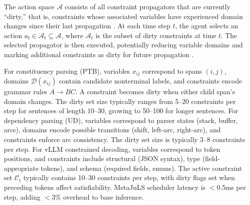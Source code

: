 \documentclass[11pt]{article}
\begin{document}
The action space $\mathcal{A}$ consists of all constraint propagators that are currently ``dirty,'' that is, constraints whose associated variables have experienced domain changes since their last propagation \citep{bessiere2006constraint}. At each time step $t$, the agent selects an action $a_t \in \mathcal{A}_t \subseteq \mathcal{A}$, where $\mathcal{A}_t$ is the subset of dirty constraints at time $t$. The selected propagator is then executed, potentially reducing variable domains and marking additional constraints as dirty for future propagation \citep{regin1994filtering,lecoutre2009str}.

For constituency parsing (PTB), variables $x_{ij}$ correspond to spans $(i,j)$, domains $\mathcal{D}(x_{ij})$ contain candidate nonterminal labels, and constraints encode grammar rules $A \to BC$. A constraint becomes dirty when either child span's domain changes. The dirty set size typically ranges from 5--20 constraints per step for sentences of length 10--30, growing to 50--100 for longer sentences. For dependency parsing (UD), variables correspond to parser states (stack, buffer, arcs), domains encode possible transitions (shift, left-arc, right-arc), and constraints enforce arc consistency. The dirty set size is typically 3--8 constraints per step. For vLLM constrained decoding, variables correspond to token positions, and constraints include structural (JSON syntax), type (field-appropriate tokens), and schema (required fields, enums). The active constraint set $\mathcal{C}_t$ typically contains 10--30 constraints per step, with dirty flags set when preceding tokens affect satisfiability. MetaJuLS scheduler latency is $<$0.5ms per step, adding $<$3\% overhead to base inference.
\end{document}
